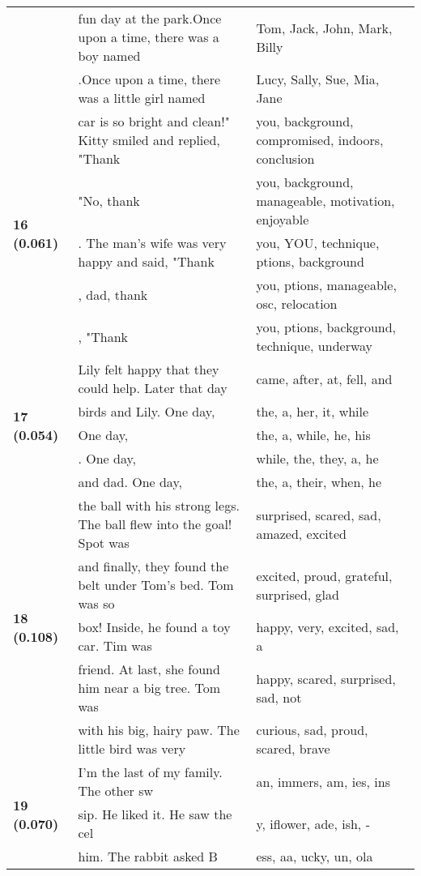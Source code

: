 \documentclass{article}
\begin{document}
\begin{adjustbox}{max width=\textwidth}
\begin{tabular}{p{} p{} p{}}
 & fun day at the park.Once upon a time, there was a boy named & Tom,  Jack,  John,  Mark,  Billy \\
 & .Once upon a time, there was a little girl named & Lucy,  Sally,  Sue,  Mia,  Jane \\
\midrule
\multirow{5}{*}{\textbf{16 (0.061)}} & car is so bright and clean!" Kitty smiled and replied, "Thank & you,  background,  compromised,  indoors,  conclusion \\
 & "No, thank & you,  background,  manageable,  motivation,  enjoyable \\
 & . The man's wife was very happy and said, "Thank & you,  YOU,  technique, ptions,  background \\
 & , dad, thank & you, ptions,  manageable, osc,  relocation \\
 & , "Thank & you, ptions,  background,  technique,  underway \\
\midrule
\multirow{5}{*}{\textbf{17 (0.054)}} & Lily felt happy that they could help.  Later that day & came,  after,  at,  fell,  and \\
 & birds and Lily. One day, & the,  a,  her,  it,  while \\
 & One day, & the,  a,  while,  he,  his \\
 & . One day, & while,  the,  they,  a,  he \\
 & and dad. One day, & the,  a,  their,  when,  he \\
\midrule
\multirow{5}{*}{\textbf{18 (0.108)}} & the ball with his strong legs. The ball flew into the goal! Spot was & surprised,  scared,  sad,  amazed,  excited \\
 & and finally, they found the belt under Tom's bed. Tom was so & excited,  proud,  grateful,  surprised,  glad \\
 & box! Inside, he found a toy car. Tim was & happy,  very,  excited,  sad,  a \\
 & friend. At last, she found him near a big tree. Tom was & happy,  scared,  surprised,  sad,  not \\
 & with his big, hairy paw.   The little bird was very & curious,  sad,  proud,  scared,  brave \\
\midrule
\multirow{5}{*}{\textbf{19 (0.070)}} & I'm the last of my family. The other sw & an, immers, am, ies, ins \\
 & sip. He liked it. He saw the cel & y, iflower, ade, ish, - \\
 & him. The rabbit asked B & ess, aa, ucky, un, ola \\

\end{tabular}
\end{adjustbox}
\end{document}
